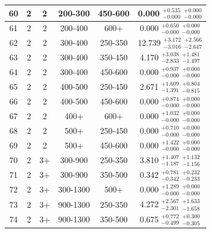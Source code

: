 \begin{table}[htbp]
\begin{centering}
\begin{tabular}{|c|c|c|c|c||c|}
\hline
60 &               2 &               2 &         200-300 &         450-600 & 0.000 $^{+0.535}_{-0.000}$ $^{+0.000}_{-0.000}$ \\ 
\hline
61 &               2 &               2 &         200-400 &            600+ & 0.000 $^{+0.650}_{-0.000}$ $^{+0.000}_{-0.000}$ \\ 
\hline
62 &               2 &               2 &         300-400 &         250-350 & 12.739 $^{+3.172}_{-3.016}$ $^{+2.566}_{-2.647}$ \\ 
\hline
63 &               2 &               2 &         300-400 &         350-450 & 4.170 $^{+3.038}_{-2.833}$ $^{+1.481}_{-1.497}$ \\ 
\hline
64 &               2 &               2 &         300-400 &         450-600 & 0.000 $^{+0.937}_{-0.000}$ $^{+0.000}_{-0.000}$ \\ 
\hline
65 &               2 &               2 &         400-500 &         250-450 & 2.671 $^{+1.609}_{-1.391}$ $^{+0.804}_{-0.815}$ \\ 
\hline
66 &               2 &               2 &         400-500 &         450-600 & 0.000 $^{+0.874}_{-0.000}$ $^{+0.000}_{-0.000}$ \\ 
\hline
67 &               2 &               2 &            400+ &            600+ & 0.000 $^{+1.032}_{-0.000}$ $^{+0.000}_{-0.000}$ \\ 
\hline
68 &               2 &               2 &            500+ &         250-450 & 0.000 $^{+0.710}_{-0.000}$ $^{+0.000}_{-0.000}$ \\ 
\hline
69 &               2 &               2 &            500+ &         450-600 & 0.000 $^{+1.422}_{-0.000}$ $^{+0.000}_{-0.000}$ \\ 
\hline
70 &               2 &              3+ &         300-900 &         250-350 & 3.810 $^{+1.407}_{-1.187}$ $^{+1.132}_{-1.156}$ \\ 
\hline
71 &               2 &              3+ &         300-900 &         350-500 & 0.342 $^{+0.781}_{-0.342}$ $^{+0.232}_{-0.233}$ \\ 
\hline
72 &               2 &              3+ &        300-1300 &            500+ & 0.000 $^{+1.289}_{-0.000}$ $^{+0.000}_{-0.000}$ \\ 
\hline
73 &               2 &              3+ &        900-1300 &         250-350 & 4.272 $^{+2.567}_{-2.301}$ $^{+1.633}_{-1.658}$ \\ 
\hline
74 &               2 &              3+ &        900-1300 &         350-500 & 0.675 $^{+0.772}_{-0.499}$ $^{+0.300}_{-0.305}$ \\ 

\end{tabular}
\end{centering}
\end{table}
